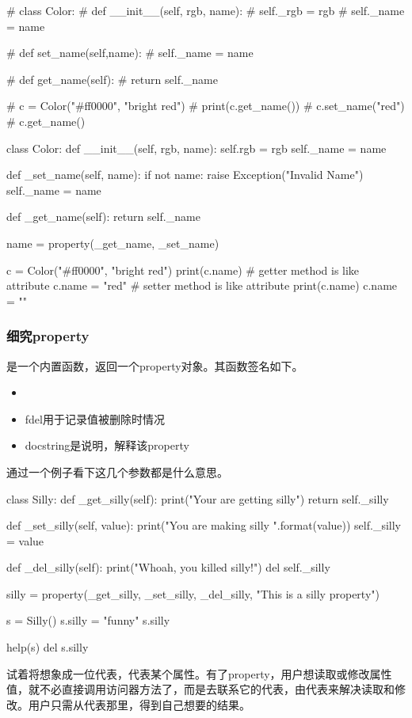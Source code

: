 \begin{python}
# class Color:
#     def __init__(self, rgb, name):
#         self._rgb = rgb
#         self._name = name

#     def set_name(self,name):
#         self._name = name

#     def get_name(self):
#         return self._name

# c = Color("#ff0000", "bright red")
# print(c.get_name())
# c.set_name("red")
# c.get_name()

class Color:
    def __init__(self, rgb, name):
        self.rgb = rgb
        self._name = name

    def _set_name(self, name):
        if not name:
            raise Exception("Invalid Name")
        self._name = name

    def _get_name(self):
        return self._name

    name = property(_get_name, _set_name)

c = Color("#ff0000", "bright red")
print(c.name)    # getter method is like attribute
c.name = "red"   # setter method is like attribute
print(c.name)
c.name = ""
\end{python}
\subsubsection{细究property}
是一个内置函数，返回一个property对象。其函数签名如下。
\begin{itemize}
\item {}
\item fdel用于记录值被删除时情况
\item docstring是说明，解释该property
\end{itemize}
通过一个例子看下这几个参数都是什么意思。
\begin{python}
class Silly:
    def _get_silly(self):
        print("Your are getting silly")
        return self._silly

    def _set_silly(self, value):
        print("You are making silly {}".format(value))
        self._silly = value

    def _del_silly(self):
        print("Whoah, you killed silly!")
        del self._silly

    silly = property(_get_silly, _set_silly, _del_silly, "This is a silly property")

s = Silly()
s.silly = "funny"
s.silly

help(s)
del s.silly
\end{python}
试着将想象成一位代表，代表某个属性。有了property，用户想读取或修改属性值，就不必直接调用访问器方法了，而是去联系它的代表，由代表来解决读取和修改。用户只需从代表那里，得到自己想要的结果。


